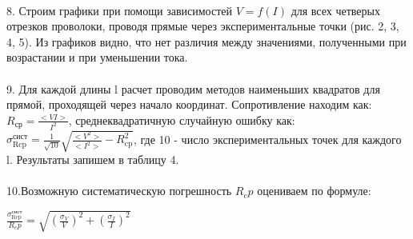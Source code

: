 \documentclass[14pt, a4paper]{scrartcl}
\begin{document}
\paragraph{}
 8.  Строим графики при помощи зависимостей $V=f(I)$ для всех четверых отрезков проволоки, проводя прямые через экспериментальные точки (рис. 2, 3, 4, 5). Из графиков видно, что нет различия между значениями, полученными при возрастании и при уменьшении тока.
 \paragraph{}
 9. Для каждой длины l расчет проводим методов наименьших квадратов для прямой, проходящей через начало координат. Сопротивление находим как: $R_\text{ср}=\frac{<VI>}{I^2}$, среднеквадратичную случайную ошибку как: $\sigma_\text{Rcp}^\text{сист}=\frac{1}{\sqrt{10}}\sqrt{\frac{<V^2>}{<I^2>}-R_\text{cp}^{2}}$, где 10 - число экспериментальных точек для каждого l. Результаты запишем в таблицу 4.
 \paragraph{}
 10.Возможную систематическую погрешность $R_cp$ оцениваем по формуле:

 $\frac{\sigma_\text{Rcp}^\text{сист}}{R_cp}=\sqrt{(\frac{\sigma_V}{V})^2+(\frac{\sigma_I}{I})^2}$
 
 \paragraph{}
 
\end{document}
